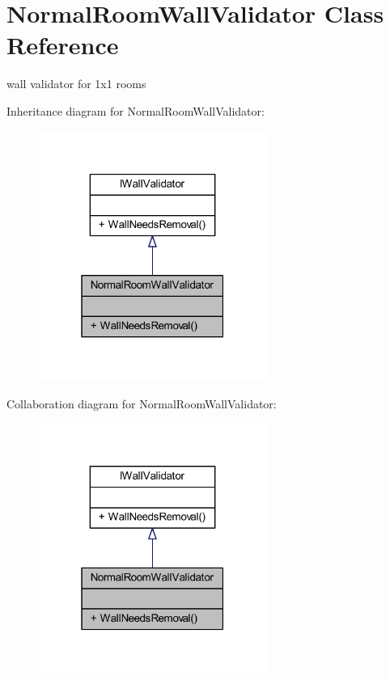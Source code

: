 \hypertarget{class_normal_room_wall_validator}{}\section{Normal\+Room\+Wall\+Validator Class Reference}
\label{class_normal_room_wall_validator}


wall validator for 1x1 rooms  




Inheritance diagram for Normal\+Room\+Wall\+Validator\+:\nopagebreak
\begin{figure}[H]
\begin{center}
\leavevmode
\includegraphics[width=211pt]{class_normal_room_wall_validator__inherit__graph}
\end{center}
\end{figure}


Collaboration diagram for Normal\+Room\+Wall\+Validator\+:\nopagebreak
\begin{figure}[H]
\begin{center}
\leavevmode
\includegraphics[width=211pt]{class_normal_room_wall_validator__coll__graph}
\end{center}
\end{figure}

